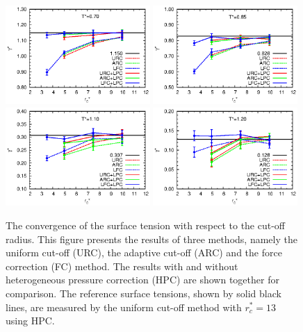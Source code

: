\documentclass[aps,pre,preprint]{revtex4}
\begin{document}
\begin{figure}
  \centering
  \includegraphics[width=0.49\textwidth]{fig/converge/tension.t0.70.eps} 
  \includegraphics[width=0.49\textwidth]{fig/converge/tension.t0.85.eps} 
  \includegraphics[width=0.49\textwidth]{fig/converge/tension.t1.10.eps} 
  \includegraphics[width=0.49\textwidth]{fig/converge/tension.t1.20.eps} 
  \caption{The convergence of the surface tension with respect to the
    cut-off radius.  This figure presents the results of three
    methods, namely the uniform cut-off (URC), the adaptive cut-off
    (ARC) and the force correction (FC) method.  The results with and
    without heterogeneous pressure correction (HPC) are shown together
    for comparison. The reference surface tensions, shown by solid
    black lines, are measured by the uniform cut-off method with
    $r_c^\ast=13$ using HPC.}
  \label{fig:tmp6}
\end{figure}
\end{document}
